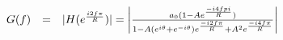 \[\displaystyle
\begin{array}{l c l}
  G(f) & = & |H(e^{\frac{i2f\pi}{R}})| = \left| \frac{a_0 (1-Ae^{\frac{-i4fpi}{R}})}{1-A(e^{i\theta}+e^{-i\theta})e^{\frac{-i2f\pi}{R}}+A^2 e^{\frac{-i4f\pi}{R}}}\right| 
\end{array}
\]



\subsection{}


\subsection{}
